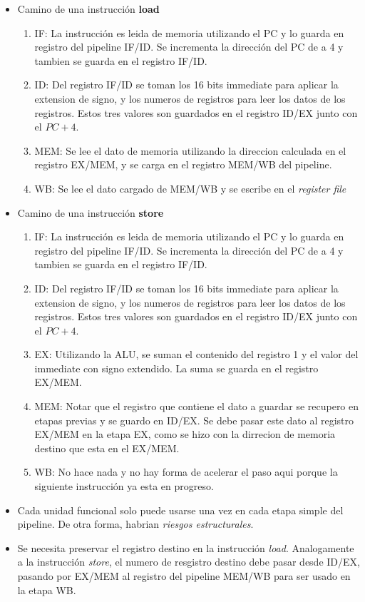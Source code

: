 \documentclass{article}
\begin{document}
\begin{itemize}
    \item Camino de una instrucción \textbf{load}
    \begin{enumerate}
        \item IF: La instrucción es leida de memoria utilizando el PC y lo guarda en registro del pipeline IF/ID. Se incrementa la dirección del PC de a 4 y tambien se guarda en el registro IF/ID.
        \item ID: Del registro IF/ID se toman los 16 bits immediate para aplicar la extension de signo, y los numeros de registros para leer los datos de los registros. Estos tres valores son guardados en el registro ID/EX junto con el \(PC+4\).
        \item MEM: Se lee el dato de memoria utilizando la direccion calculada en el registro EX/MEM, y se carga en el registro MEM/WB del pipeline.
        \item WB: Se lee el dato cargado de MEM/WB y se escribe en el \textit{register file}
    \end{enumerate}
    \item Camino de una instrucción \textbf{store}
    \begin{enumerate}
        \item IF: La instrucción es leida de memoria utilizando el PC y lo guarda en registro del pipeline IF/ID. Se incrementa la dirección del PC de a 4 y tambien se guarda en el registro IF/ID.
        \item ID: Del registro IF/ID se toman los 16 bits immediate para aplicar la extension de signo, y los numeros de registros para leer los datos de los registros. Estos tres valores son guardados en el registro ID/EX junto con el \(PC+4\).
        \item EX: Utilizando la ALU, se suman el contenido del registro 1 y el valor del immediate con signo extendido. La suma se guarda en el registro EX/MEM.
        \item MEM: Notar que el registro que contiene el dato a guardar se recupero en etapas previas y se guardo en ID/EX. Se debe pasar este dato al registro EX/MEM en la etapa EX, como se hizo con la dirrecion de memoria destino que esta en el EX/MEM. 
        \item WB: No hace nada y no hay forma de acelerar el paso aqui porque la siguiente instrucción ya esta en progreso.
    \end{enumerate}
    \item Cada unidad funcional solo puede usarse una vez en cada etapa simple del pipeline. De otra forma, habrian \textit{riesgos estructurales}.
    \item Se necesita preservar el registro destino en la instrucción \textit{load}. Analogamente a la instrucción \textit{store}, el numero de resgistro destino debe pasar desde ID/EX, pasando por EX/MEM al registro del pipeline MEM/WB para ser usado en la etapa WB.
\end{itemize}
\end{document}
